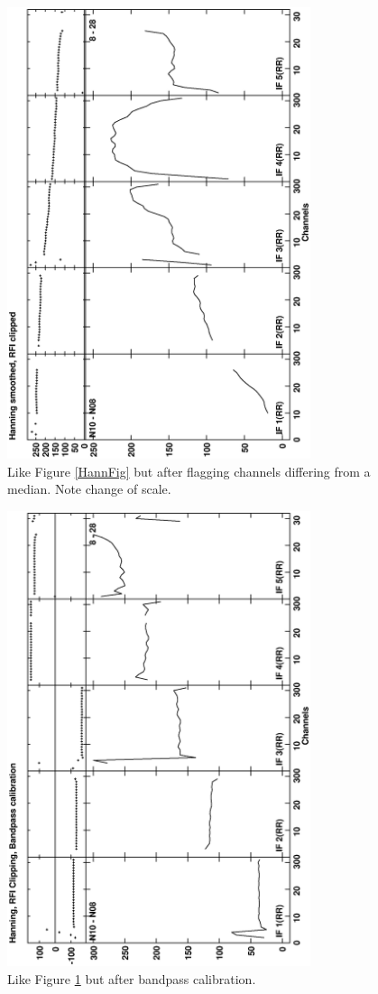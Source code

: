 \documentclass[journal]{IEEEtran}
\begin{document}
\begin{figure}
\includegraphics[angle=-90,width=3.5in]{figs/HannRFI.eps}
\caption{ 
Like Figure \ref{HannFig} but after flagging channels differing from a
median.
Note change of scale.
} 
\label{HannRFIFig}
\end{figure}

\begin{figure}
\includegraphics[angle=-90,width=3.5in]{figs/HannRFIBP.eps}
\caption{ 
Like Figure \ref{HannRFIFig} but after bandpass calibration.
} 
\label{HannRFIBPFig}
\end{figure}
\end{document}
